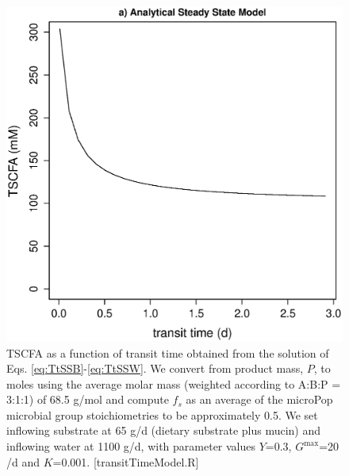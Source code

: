 \documentclass[a4paper]{article}
\begin{document}
\begin{figure}
    \centering
    \includegraphics[scale=0.4]{images/TSCFAandTt.eps}
    \caption{TSCFA as a function of transit time obtained from the solution of Eqs. \ref{eq:TtSSB}-\ref{eq:TtSSW}. We convert from product mass, $P$, to moles using the average molar mass (weighted according to A:B:P = 3:1:1) of 68.5 g/mol and compute $f_s$ as an average of the microPop microbial group stoichiometries to be approximately 0.5. We set inflowing substrate at 65 g/d (dietary substrate plus mucin) and inflowing water at 1100 g/d, with parameter values $Y$=0.3, $G^{\max}$=20 /d and $K$=0.001. [transitTimeModel.R]
    }
    \label{fig:transitTimeAnal}
\end{figure}
\end{document}
